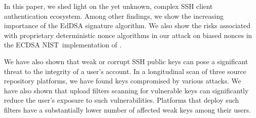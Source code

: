 In this paper, we shed light on the yet unknown, complex SSH client authentication ecosystem. Among other findings, we show the increasing importance of the EdDSA signature algorithm. We also show the risks associated with proprietary deterministic nonce algorithms in our attack on biased nonces in the ECDSA NIST~\pfivetwoone implementation of \putty.

We have also shown that weak or corrupt SSH public keys can pose a significant threat to the integrity of a user's account. In a longitudinal scan of three source repository platforms, we have found keys compromised by various attacks. We have also shown that upload filters scanning for vulnerable keys can significantly reduce the user's exposure to such vulnerabilities. Platforms that deploy such filters have a substantially lower number of affected weak keys among their users.
